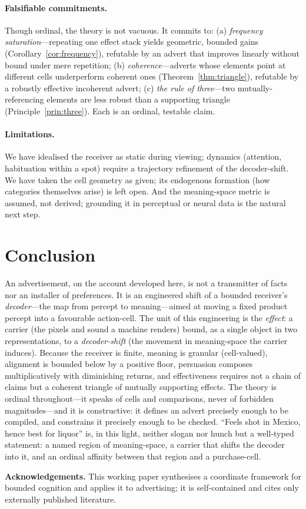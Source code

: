 \documentclass[twocolumn,11pt,a4paper]{article}
\theoremstyle{adv}
\theoremstyle{definition}
\theoremstyle{remark}
\begin{document}
\paragraph{Falsifiable commitments.}
Though ordinal, the theory is not vacuous. It commits to:
(a) \emph{frequency saturation}---repeating one effect stack yields
geometric, bounded gains (Corollary~\ref{cor:frequency}), refutable by an
advert that improves linearly without bound under mere repetition;
(b) \emph{coherence}---adverts whose elements point at different cells
underperform coherent ones (Theorem~\ref{thm:triangle}), refutable by a
robustly effective incoherent advert; (c) \emph{the rule of three}---two
mutually-referencing elements are less robust than a supporting triangle
(Principle~\ref{prin:three}). Each is an ordinal, testable claim.

\paragraph{Limitations.}
We have idealised the receiver as static during viewing; dynamics
(attention, habituation within a spot) require a trajectory refinement of
the decoder-shift. We have taken the cell geometry as given; its
endogenous formation (how categories themselves arise) is left open. And
the meaning-space metric is assumed, not derived; grounding it in
perceptual or neural data is the natural next step.

\section{Conclusion}
\label{sec:conclusion}

An advertisement, on the account developed here, is not a transmitter of
facts nor an installer of preferences. It is an engineered shift of a
bounded receiver's \emph{decoder}---the map from percept to meaning---aimed
at moving a fixed product percept into a favourable action-cell. The unit
of this engineering is the \emph{effect}: a carrier (the pixels and sound a
machine renders) bound, as a single object in two representations, to a
\emph{decoder-shift} (the movement in meaning-space the carrier induces).
Because the receiver is finite, meaning is granular (cell-valued),
alignment is bounded below by a positive floor, persuasion composes
multiplicatively with diminishing returns, and effectiveness requires not a
chain of claims but a coherent triangle of mutually supporting effects. The
theory is ordinal throughout---it speaks of cells and comparisons, never of
forbidden magnitudes---and it is constructive: it defines an advert
precisely enough to be compiled, and constrains it precisely enough to be
checked. ``Feels shot in Mexico, hence best for liquor'' is, in this light,
neither slogan nor hunch but a well-typed statement: a named region of
meaning-space, a carrier that shifts the decoder into it, and an ordinal
affinity between that region and a purchase-cell.

\bigskip
\noindent\textbf{Acknowledgements.} This working paper synthesises a
coordinate framework for bounded cognition and applies it to advertising;
it is self-contained and cites only externally published literature.



\end{document}
